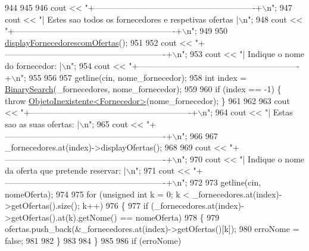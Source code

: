 \begin{DoxyCode}
944 
945     
946     cout << \textcolor{stringliteral}{"+----------------------------------------------------------+\(\backslash\)n"};
947     cout << \textcolor{stringliteral}{"| Estes sao todos os fornecedores e respetivas ofertas     |\(\backslash\)n"};
948     cout << \textcolor{stringliteral}{"+----------------------------------------------------------+\(\backslash\)n"};
949     
950     \hyperlink{classEmpresa_aa47e9a64800a41180b7f374b73a1f32b}{displayFornecedorescomOfertas}();
951 
952     cout << \textcolor{stringliteral}{"+----------------------------------------------------------+\(\backslash\)n"};
953     cout << \textcolor{stringliteral}{"| Indique o nome do fornecedor:                            |\(\backslash\)n"};
954     cout << \textcolor{stringliteral}{"+----------------------------------------------------------+\(\backslash\)n"};
955 
956 
957     getline(cin, nome\_fornecedor);
958     \textcolor{keywordtype}{int} index = \hyperlink{extras_8h_abc85c93edf561168b5bbee8054caa388}{BinarySearch}(\_fornecedores, nome\_fornecedor);
959 
960     \textcolor{keywordflow}{if} (index == -1) \{ \textcolor{keywordflow}{throw} \hyperlink{classObjetoInexistente}{ObjetoInexistente<Fornecedor>}(nome\_fornecedor); \}
961 
962 
963     cout << \textcolor{stringliteral}{"+----------------------------------------------------------+\(\backslash\)n"};
964     cout << \textcolor{stringliteral}{"| Estas sao as suas ofertas:                               |\(\backslash\)n"};
965     cout << \textcolor{stringliteral}{"+----------------------------------------------------------+\(\backslash\)n"};
966 
967     \_fornecedores.at(index)->displayOfertas();
968 
969     cout << \textcolor{stringliteral}{"+----------------------------------------------------------+\(\backslash\)n"};
970     cout << \textcolor{stringliteral}{"| Indique o nome da oferta que pretende reservar:          |\(\backslash\)n"};
971     cout << \textcolor{stringliteral}{"+----------------------------------------------------------+\(\backslash\)n"};
972     
973     getline(cin, nomeOferta);
974 
975     \textcolor{keywordflow}{for} (\textcolor{keywordtype}{unsigned} \textcolor{keywordtype}{int} k = 0; k < \_fornecedores.at(index)->getOfertas().size(); k++)
976     \{
977         \textcolor{keywordflow}{if} (\_fornecedores.at(index)->getOfertas().at(k).getNome() == nomeOferta)
978         \{
979             ofertas.push\_back(&\_fornecedores.at(index)->getOfertas()[k]);
980             erroNome = \textcolor{keyword}{false};
981 
982         \}
983 
984     \}
985 
986     \textcolor{keywordflow}{if} (erroNome)

\end{DoxyCode}
